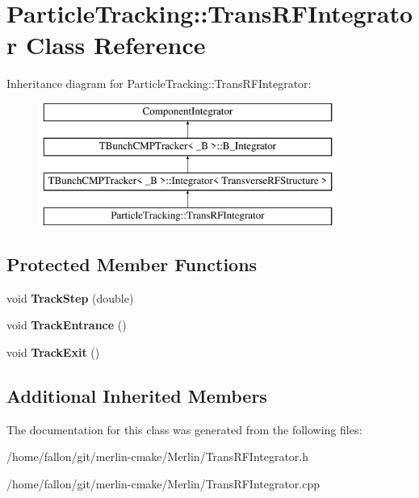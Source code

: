 \hypertarget{classParticleTracking_1_1TransRFIntegrator}{}\section{Particle\+Tracking\+:\+:Trans\+R\+F\+Integrator Class Reference}
\label{classParticleTracking_1_1TransRFIntegrator}
Inheritance diagram for Particle\+Tracking\+:\+:Trans\+R\+F\+Integrator\+:\begin{figure}[H]
\begin{center}
\leavevmode
\includegraphics[height=4.000000cm]{classParticleTracking_1_1TransRFIntegrator}
\end{center}
\end{figure}
\subsection*{Protected Member Functions}
\begin{DoxyCompactItemize}
\item 
\mbox{\label{classParticleTracking_1_1TransRFIntegrator_ae8d6b078014028030124b4ecf8cb43ec}} 
void {\bfseries Track\+Step} (double)
\item 
\mbox{\label{classParticleTracking_1_1TransRFIntegrator_a00893203087d786bf3a168f7b46bbdde}} 
void {\bfseries Track\+Entrance} ()
\item 
\mbox{\label{classParticleTracking_1_1TransRFIntegrator_a8ea7469df3f02053437ca66b260597bb}} 
void {\bfseries Track\+Exit} ()
\end{DoxyCompactItemize}
\subsection*{Additional Inherited Members}


The documentation for this class was generated from the following files\+:\begin{DoxyCompactItemize}
\item 
/home/fallon/git/merlin-\/cmake/\+Merlin/Trans\+R\+F\+Integrator.\+h\item 
/home/fallon/git/merlin-\/cmake/\+Merlin/Trans\+R\+F\+Integrator.\+cpp\end{DoxyCompactItemize}
